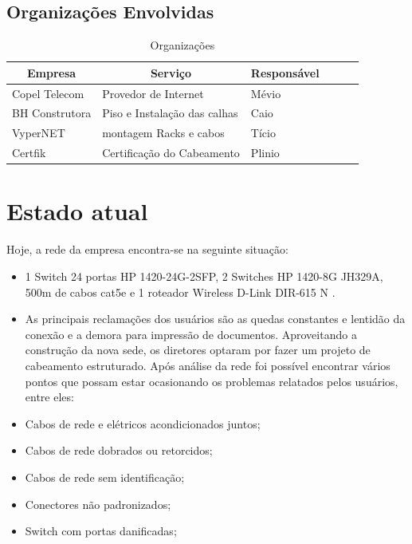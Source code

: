 \documentclass[	DIV=calc,%
paper=a4,%
fontsize=12pt,%
onecolumn]{scrartcl}	 					%
\begin{document}
	\subsection{Organizações Envolvidas}
	\begin{table}[h!] %
		\centering
		\caption{Organizações}
		\label{tab1} %
		\begin{tabular}{|l|l|l|l|l|l|}
			\hline
			\multicolumn{1}{|c|}{\textbf{Empresa}} & 
			\multicolumn{1}{c|}{\textbf{Serviço}} & 
			\multicolumn{1}{c|}{\textbf{Responsável}} \\ \hline
			Copel Telecom  & Provedor de Internet          & Mévio \\ \hline		
			BH Construtora & Piso e Instalação das calhas  & Caio\\ \hline
			VyperNET       & montagem Racks e cabos        & Tício \\ \hline
			Certfik       & Certificação do Cabeamento     & Plinio \\ \hline
		\end{tabular}
	\end{table}
	
	
	
	\section{Estado atual}
	Hoje, a rede da empresa encontra-se na seguinte situação:
	\begin{itemize}
		\item 1 Switch 24 portas HP 1420-24G-2SFP, 2 Switches HP 1420-8G JH329A, 500m de cabos cat5e e 1 roteador Wireless D-Link DIR-615 N .
		\item As principais reclamações dos usuários são as quedas constantes e lentidão da conexão e a demora para impressão de documentos. Aproveitando a construção da nova sede, os diretores optaram por fazer um projeto de cabeamento estruturado.
	Após análise da rede foi possível encontrar vários pontos que possam estar ocasionando os problemas relatados pelos usuários, entre eles:
		\item Cabos de rede e elétricos acondicionados juntos;
		\item Cabos de rede dobrados ou retorcidos;
		\item Cabos de rede sem identificação;		
		\item Conectores não padronizados;
		\item Switch com portas danificadas;
	\end{itemize}
	
\end{document}
